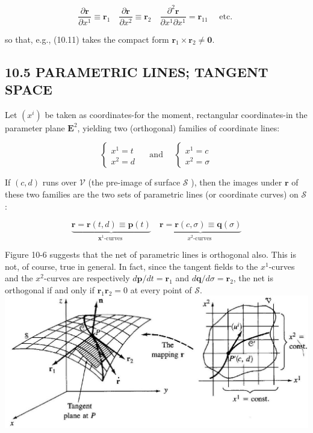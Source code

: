 \documentclass[10pt]{article}
\begin{document}
$$
\frac{\partial \mathbf{r}}{\partial x^{1}} \equiv \mathbf{r}_{1} \quad \frac{\partial \mathbf{r}}{\partial x^{2}} \equiv \mathbf{r}_{2} \quad \frac{\partial^{2} \mathbf{r}}{\partial x^{1} \partial x^{1}}=\mathbf{r}_{11} \quad \text { etc. }
$$

so that, e.g., (10.11) takes the compact form $\mathbf{r}_{1} \times \mathbf{r}_{2} \neq \mathbf{0}$.

\subsection*{10.5 PARAMETRIC LINES; TANGENT SPACE}
Let $\left(x^{i}\right)$ be taken as coordinates-for the moment, rectangular coordinates-in the parameter plane $\mathbf{E}^{2}$, yielding two (orthogonal) families of coordinate lines:

$$
\left\{\begin{array} { l } 
{ x ^ { 1 } = t } \\
{ x ^ { 2 } = d }
\end{array} \quad \text { and } \quad \left\{\begin{array}{l}
x^{1}=c \\
x^{2}=\sigma
\end{array}\right.\right.
$$

If $(c, d)$ runs over $\mathscr{V}$ (the pre-image of surface $\mathscr{S}$ ), then the images under $\mathbf{r}$ of these two families are the two sets of parametric lines (or coordinate curves) on $\mathscr{S}$ :

$$
\underbrace{\mathbf{r}=\mathbf{r}(t, d) \equiv \mathbf{p}(t)}_{\boldsymbol{x}^{1} \text {-curves }} \quad \underbrace{\mathbf{r}=\mathbf{r}(c, \sigma) \equiv \mathbf{q}(\sigma)}_{x^{2} \text {-curves }}
$$

Figure 10-6 suggests that the net of parametric lines is orthogonal also. This is not, of course, true in general. In fact, since the tangent fields to the $x^{1}$-curves and the $x^{2}$-curves are respectively $d \mathbf{p} / d t=\mathbf{r}_{1}$ and $d \mathbf{q} / d \sigma=\mathbf{r}_{2}$, the net is orthogonal if and only if $\mathbf{r}_{1} \mathbf{r}_{2}=0$ at every point of $\mathscr{S}$.\\
\includegraphics[max width=\textwidth, center]{2024_04_03_41f90be4f896e21f0dc9g-141}
\end{document}
